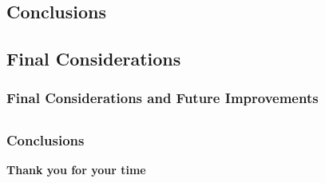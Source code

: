 \subsection{Conclusions}
\subsection{Final Considerations}

\begin{frame}
    \frametitle{Final Considerations and Future Improvements}

    
\end{frame}

\subsection{}

\begin{frame}
    \frametitle{Conclusions}

    \vspace*{\fill}
    \begin{center}
        \Huge{\textbf{Thank you for your time}}
    \end{center}
    \vspace*{\fill}
    
\end{frame}